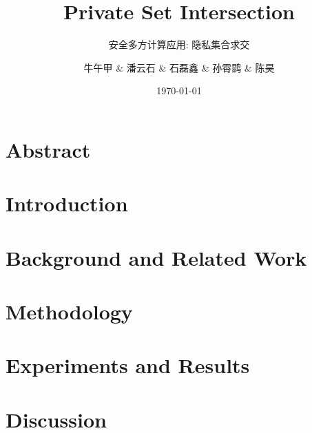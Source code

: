 \documentclass[lang=cn,10pt]{elegantbook}
\title{Private Set Intersection}
\subtitle{安全多方计算应用: 隐私集合求交}
\author{牛午甲 \& 潘云石 \& 石磊鑫 \& 孙霄鹍 \& 陈昊}
\institute{USTC}
\date{\today}
\begin{document}
\maketitle
\frontmatter

\tableofcontents

\mainmatter

\chapter{Abstract}


\chapter{Introduction}


\chapter{Background and Related Work}


\chapter{Methodology}\label{chap:method}


\chapter{Experiments and Results}


\chapter{Discussion}





\printbibliography[title=\ebibname]
\end{document}
